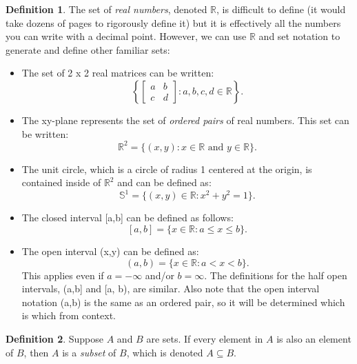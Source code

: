 \documentclass{amsart} %
\theoremstyle{definition} %
\newtheorem*{dfn}{Definition} %
\theoremstyle{definition}
\theoremstyle{remark} %
\begin{document}
\begin{dfn}
 \quad The set of \emph{real numbers}, denoted $\mathbb{R}$, is difficult to define (it would take dozens of pages to rigorously define it) but it is effectively all the numbers you can write with a decimal point. However, we can use $\mathbb{R}$ and set notation to generate and define other familiar sets:

    \begin{itemize}
      \item The set of 2 x 2 real matrices can be written:
            $$ \left\{\begin{bmatrix}
                  a & b \\
                  c & d
                \end{bmatrix} : a, b, c, d \in \mathbb{R}\right\}. $$ %
      \item The xy-plane represents the set of \emph{ordered pairs} of real numbers. This set can be written:
            \[ \mathbb{R}^2 = \{(x,y) : x \in \mathbb{R} \text{ and } y \in \mathbb{R}\}. \]
      \item The unit circle, which is a circle of radius 1 centered at the origin, is contained inside of $\mathbb{R}^2$ and can be defined as:
            \[ \mathbb{S}^1 = \{(x,y) \in \mathbb{R} : x^2 + y^2 = 1\}.  \]
      \item The closed interval [a,b] can be defined as follows:
            \[ [a,b] = \{x \in \mathbb{R} : a \le x \le b\}.  \]
      \item The open interval (x,y) can be defined as:
            \[ (a,b) = \{x \in \mathbb{R} : a < x < b\}. \]
            This applies even if $a = -\infty$ and/or $b = \infty$. The definitions for the half open intervals, (a,b] and [a, b), are similar. Also note that the           open interval notation (a,b) is the same as an ordered pair, so it will be determined which is which from context.
    \end{itemize}

\end{dfn}

\begin{dfn}
\boxed{\subseteq} \quad Suppose $A$ and $B$ are sets. If every element in $A$ is also an element of $B$, then $A$ is a \emph{subset} of $B$, which is denoted $A \subseteq B$.
\end{dfn}
\end{document}
